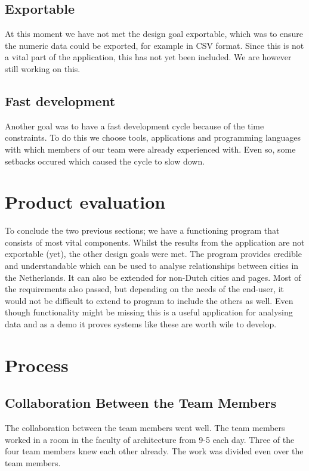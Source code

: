\subsection{Exportable}
At this moment we have not met the design goal exportable, which was to ensure the numeric data could be exported, for example in CSV format. Since this is not a vital part of the application, this has not yet been included. We are however still working on this. 

\subsection{Fast development}
Another goal was to have a fast development cycle because of the time constraints. To do this we choose tools, applications and programming languages with which members of our team were already experienced with. Even so, some setbacks occured which caused the cycle to slow down.

\section{Product evaluation}
To conclude the two previous sections; we have a functioning program that consists of most vital components. Whilst the results from the application are not exportable (yet), the other design goals were met. The program provides credible and understandable which can be used to analyse relationships between cities in the Netherlands. It can also be extended for non-Dutch cities and pages. Most of the requirements also passed, but depending on the needs of the end-user, it would not be difficult to extend to program to include the others as well. Even though functionality might be missing this is a useful application for analysing data and as a demo it proves systems like these are worth wile to develop.

\section{Process}

\subsection{Collaboration Between the Team Members}
The collaboration between the team members went well. The team members worked in a room in the faculty of architecture from 9-5 each day. Three of the four team members knew each other already. The work was divided even over the team members. 


